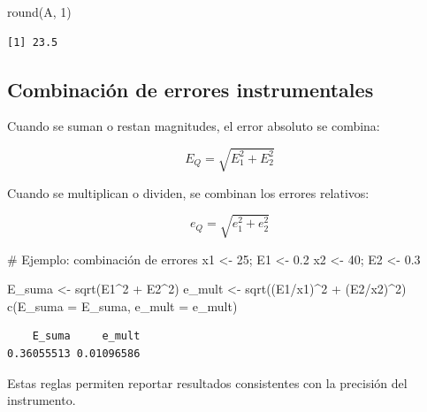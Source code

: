 \documentclass[
  spanish,
  letterpaper,
  DIV=11,
  numbers=noendperiod]{scrreprt}
\newenvironment{Shaded}{\begin{snugshade}}{\end{snugshade}}
\newcommand{\AttributeTok}[1]{\textcolor[rgb]{0.40,0.45,0.13}{#1}}
\newcommand{\CommentTok}[1]{\textcolor[rgb]{0.37,0.37,0.37}{#1}}
\newcommand{\DecValTok}[1]{\textcolor[rgb]{0.68,0.00,0.00}{#1}}
\newcommand{\FloatTok}[1]{\textcolor[rgb]{0.68,0.00,0.00}{#1}}
\newcommand{\FunctionTok}[1]{\textcolor[rgb]{0.28,0.35,0.67}{#1}}
\newcommand{\NormalTok}[1]{\textcolor[rgb]{0.00,0.23,0.31}{#1}}
\newcommand{\OtherTok}[1]{\textcolor[rgb]{0.00,0.23,0.31}{#1}}
\newcommand{\SpecialCharTok}[1]{\textcolor[rgb]{0.37,0.37,0.37}{#1}}
\begin{document}
\begin{Shaded}
\begin{Highlighting}[]
\FunctionTok{round}\NormalTok{(A, }\DecValTok{1}\NormalTok{)}
\end{Highlighting}
\end{Shaded}

\begin{verbatim}
[1] 23.5
\end{verbatim}

\subsection{Combinación de errores
instrumentales}\label{combinaciuxf3n-de-errores-instrumentales}

Cuando se suman o restan magnitudes, el error absoluto se combina:

\[E_Q = \sqrt{E_1^2 + E_2^2}\]

Cuando se multiplican o dividen, se combinan los errores relativos:

\[e_Q = \sqrt{e_1^2 + e_2^2}\]

\begin{Shaded}
\begin{Highlighting}[]
\CommentTok{\# Ejemplo: combinación de errores}
\NormalTok{x1 }\OtherTok{\textless{}{-}} \DecValTok{25}\NormalTok{; E1 }\OtherTok{\textless{}{-}} \FloatTok{0.2}
\NormalTok{x2 }\OtherTok{\textless{}{-}} \DecValTok{40}\NormalTok{; E2 }\OtherTok{\textless{}{-}} \FloatTok{0.3}

\NormalTok{E\_suma }\OtherTok{\textless{}{-}} \FunctionTok{sqrt}\NormalTok{(E1}\SpecialCharTok{\^{}}\DecValTok{2} \SpecialCharTok{+}\NormalTok{ E2}\SpecialCharTok{\^{}}\DecValTok{2}\NormalTok{)}
\NormalTok{e\_mult }\OtherTok{\textless{}{-}} \FunctionTok{sqrt}\NormalTok{((E1}\SpecialCharTok{/}\NormalTok{x1)}\SpecialCharTok{\^{}}\DecValTok{2} \SpecialCharTok{+}\NormalTok{ (E2}\SpecialCharTok{/}\NormalTok{x2)}\SpecialCharTok{\^{}}\DecValTok{2}\NormalTok{)}
\FunctionTok{c}\NormalTok{(}\AttributeTok{E\_suma =}\NormalTok{ E\_suma, }\AttributeTok{e\_mult =}\NormalTok{ e\_mult)}
\end{Highlighting}
\end{Shaded}

\begin{verbatim}
    E_suma     e_mult 
0.36055513 0.01096586 
\end{verbatim}

Estas reglas permiten reportar resultados consistentes con la precisión
del instrumento.
\end{document}
